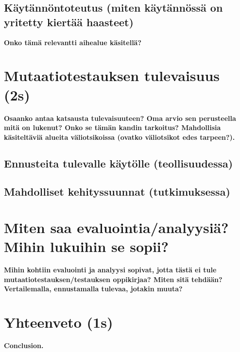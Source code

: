 \documentclass[finnish, grading]{tktltiki2}
\theoremstyle{definition}
\theoremstyle{remark}
\begin{document}
\subsection{Käytännöntoteutus (miten käytännössä on yritetty kiertää haasteet)}

\textbf{Onko tämä relevantti aihealue käsitellä?}

\section{Mutaatiotestauksen tulevaisuus (2s)}

\textbf{Osaanko antaa katsausta tulevaisuuteen? Oma arvio sen perusteella mitä on lukenut? Onko se tämän kandin tarkoitus? Mahdollisia käsiteltäviä alueita väliotsikoissa (ovatko väliotsikot edes tarpeen?).}

\subsection{Ennusteita tulevalle käytölle (teollisuudessa)}

\subsection{Mahdolliset kehityssuunnat (tutkimuksessa)}

\section{Miten saa evaluointia/analyysiä? Mihin lukuihin se sopii?}

\textbf{Mihin kohtiin evaluointi ja analyysi sopivat, jotta tästä ei tule mutaatiotestauksen/testauksen oppikirjaa? Miten sitä tehdään? Vertailemalla, ennustamalla tulevaa, jotakin muuta?}

\section{Yhteenveto (1s)}

\textbf{Conclusion.}

 






 


\end{document}
